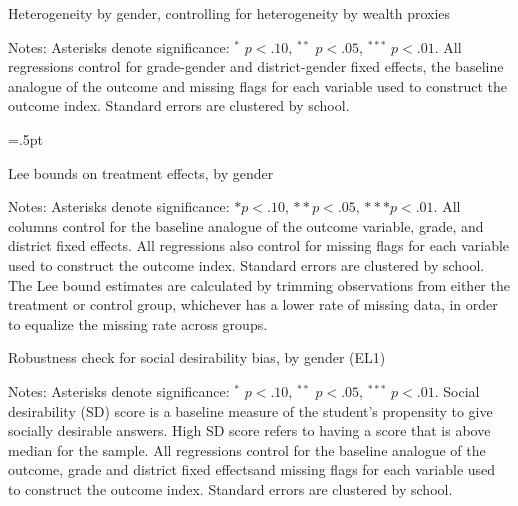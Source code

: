\documentclass[letterpaper,12pt,pdftex]{article}
\begin{document}
\clearpage
\newpage

\begin{table}
\tabcolsep=2.8pt
		\caption{Heterogeneity by gender, controlling for heterogeneity by wealth proxies}
		\label{tab_hetgen_wealth}
		\vspace{.4cm}
		\begin{center}
			\small
			
		\end{center}
\flushleft \footnotesize {Notes: Asterisks denote significance: $^*$ $p < .10$, $^{**}$ $p < .05$, $^{***}$ $p < .01$. All regressions control for grade-gender and district-gender fixed effects, the baseline analogue of the outcome and missing flags for each variable used to construct the outcome index. Standard errors are clustered by school.}
\end{table}
\restoregeometry

\clearpage
\newpage

\begin{table}
\tabcolsep=.5pt
\caption{Lee bounds on treatment effects, by gender}
\label{tab_lee_bounds}
\footnotesize

\vspace{0.5cm}
\flushleft \footnotesize {Notes: Asterisks denote significance: $* p < .10$, $** p < .05$, $*** p < .01$. All columns control for the baseline analogue of the outcome variable, grade, and district fixed effects. All regressions also control for missing flags for each variable used to construct the outcome index. Standard errors are clustered by school. The Lee bound estimates are calculated by trimming observations from either the treatment or control group, whichever has a lower rate of missing data, in order to equalize the missing rate across groups.}
\end{table}
\restoregeometry

\clearpage
\newpage

\begin{table}
\tabcolsep=2.8pt
		\caption{Robustness check for social desirability bias, by gender (EL1)}
		\label{el1_sds_panels}
		\vspace{.4cm}
		\begin{center}
			\footnotesize
			
		\end{center}
\flushleft \footnotesize {Notes: Asterisks denote significance: $^*$ $p < .10$, $^{**}$ $p < .05$, $^{***}$ $p < .01$. Social desirability (SD) score is a baseline measure of the student's propensity to give socially desirable answers. High SD score refers to having a score that is above median for the sample. All regressions control for the baseline analogue of the outcome, grade and district fixed effectsand missing flags for each variable used to construct the outcome index. Standard errors are clustered by school.}
\end{table}
\end{document}
